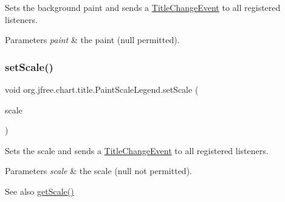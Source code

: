 Sets the background paint and sends a \mbox{\hyperlink{}{Title\+Change\+Event}} to all registered listeners.


\begin{DoxyParams}{Parameters}
{\em paint} & the paint ({\ttfamily null} permitted). \\
\hline
\end{DoxyParams}
\mbox{\label{classorg_1_1jfree_1_1chart_1_1title_1_1_paint_scale_legend_a35c03ac444a944d89f057e12420b8525}} 
\subsubsection{\texorpdfstring{set\+Scale()}{setScale()}}
{\footnotesize\ttfamily void org.\+jfree.\+chart.\+title.\+Paint\+Scale\+Legend.\+set\+Scale (\begin{DoxyParamCaption}\item[{\mbox{\hyperlink{interfaceorg_1_1jfree_1_1chart_1_1renderer_1_1_paint_scale}{Paint\+Scale}}}]{scale }\end{DoxyParamCaption})}

Sets the scale and sends a \mbox{\hyperlink{}{Title\+Change\+Event}} to all registered listeners.


\begin{DoxyParams}{Parameters}
{\em scale} & the scale ({\ttfamily null} not permitted).\\
\hline
\end{DoxyParams}
\begin{DoxySeeAlso}{See also}
\mbox{\hyperlink{classorg_1_1jfree_1_1chart_1_1title_1_1_paint_scale_legend_ac628c770c4529240f5eb1c013cbb0438}{get\+Scale()}} 
\end{DoxySeeAlso}
\mbox{\label{classorg_1_1jfree_1_1chart_1_1title_1_1_paint_scale_legend_a1362e27da5a7d168bb17453aa41dd14f}} 
